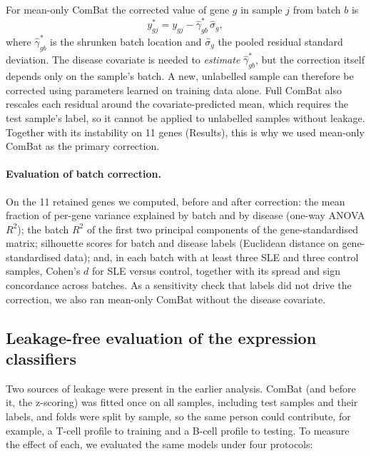 \documentclass[11pt]{article}
\begin{document}
For mean-only ComBat the corrected value of gene $g$ in sample $j$ from batch $b$ is
\begin{equation}
y^{*}_{gj} = y_{gj} - \hat{\gamma}^{*}_{gb}\,\hat{\sigma}_g ,
\label{eq:combat}
\end{equation}
where $\hat{\gamma}^{*}_{gb}$ is the shrunken batch location and $\hat{\sigma}_g$ the pooled residual standard deviation. The disease covariate is needed to \emph{estimate} $\hat{\gamma}^{*}_{gb}$, but the correction itself depends only on the sample's batch. A new, unlabelled sample can therefore be corrected using parameters learned on training data alone. Full ComBat also rescales each residual around the covariate-predicted mean, which requires the test sample's label, so it cannot be applied to unlabelled samples without leakage. Together with its instability on 11 genes (Results), this is why we used mean-only ComBat as the primary correction.

\paragraph{Evaluation of batch correction.} On the 11 retained genes we computed, before and after correction: the mean fraction of per-gene variance explained by batch and by disease (one-way ANOVA $R^2$); the batch $R^2$ of the first two principal components of the gene-standardised matrix; silhouette scores for batch and disease labels (Euclidean distance on gene-standardised data); and, in each batch with at least three SLE and three control samples, Cohen's $d$ for SLE versus control, together with its spread and sign concordance across batches. As a sensitivity check that labels did not drive the correction, we also ran mean-only ComBat without the disease covariate.

\subsection{Leakage-free evaluation of the expression classifiers}

Two sources of leakage were present in the earlier analysis. ComBat (and before it, the z-scoring) was fitted once on all samples, including test samples and their labels, and folds were split by sample, so the same person could contribute, for example, a T-cell profile to training and a B-cell profile to testing. To measure the effect of each, we evaluated the same models under four protocols:
\end{document}
